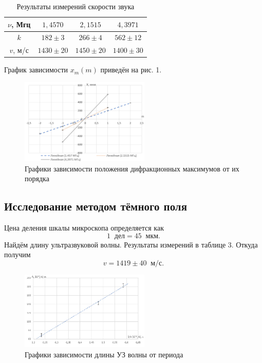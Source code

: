 \documentclass[a4paper]{article}
\begin{document}
\begin{table}[!ht]
    \centering
    \caption{Результаты измерений скорости звука}
    \begin{tabular}{|c|c|c|c|}
    \hline
    $\nu$, Мгц & $1,4570$      & $2,1515$      & $4,3971$      \\ \hline
    $k$        & $182 \pm 3$   & $266 \pm 4$   & $562 \pm 12$  \\ \hline
    $v$, м/с   & $1430 \pm 20$ & $1450 \pm 20$ & $1400 \pm 30$ \\ \hline
    \end{tabular}
    \end{table}


\noindent График зависимости $x_m(m)$ приведён на рис. 1.
\begin{figure}[!ht]
			\begin{center}
				\includegraphics[width = 0.55\textwidth]{images/Im1.jpg}
		        \caption{Графики зависимости положения дифракционных максимумов от их порядка}
			\end{center}
    \end{figure}

\subsection{Исследование методом тёмного поля}


Цена деления шкалы микроскопа определяется как $$1 \;\;\text{дел} = 45 \;\;\text{мкм}.$$ Найдём длину ультразвуковой волны. Результаты измерений в таблице 3. Откуда получим $$v = 1419 \pm 40 \;\; \text{м/с}.$$

\begin{figure}[!ht]
			\begin{center}
				\includegraphics[width = 0.55\textwidth]{images/Im2.jpg}
		        \caption{Графики зависимости длины УЗ волны от периода}
			\end{center}
\end{figure}
\end{document}
